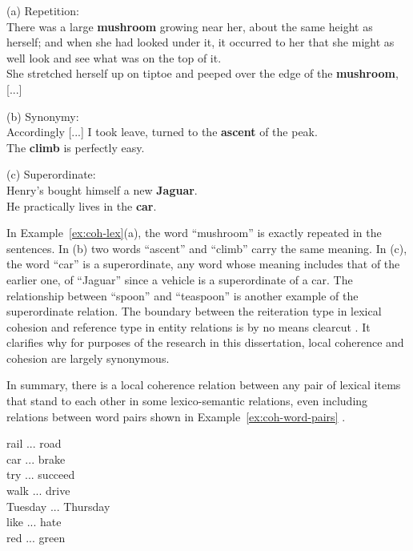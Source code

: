 \begin{examples}
    \label{ex:coh-lex}
    (a) Repetition: \\
    There was a large \textbf{mushroom} growing near her, about the same height as herself; and when she had looked under it, it occurred to her that she might as well look and see what was on the top of it.\\
    She stretched herself up on tiptoe and peeped over the edge of the \textbf{mushroom}, [...] 

    (b) Synonymy: \\
    Accordingly [...] I took leave, turned to the \textbf{ascent} of the peak. \\
    The \textbf{climb} is perfectly easy. 

    (c) Superordinate: \\
    Henry's bought himself a new \textbf{Jaguar}. \\
    He practically lives in the \textbf{car}. 

\end{examples} 

In Example~\ref{ex:coh-lex}(a), the word ``mushroom'' is exactly repeated in the sentences.  
In (b) two words ``ascent'' and ``climb'' carry the same meaning. 
In (c), the word ``car'' is a superordinate, any word whose meaning includes that of the earlier one, of ``Jaguar'' since a vehicle is a superordinate of a car. 
The relationship between ``spoon'' and ``teaspoon'' is another example of the superordinate relation. 
The boundary between the reiteration type in lexical cohesion and reference type in entity relations is by no means clearcut \cite{halliday76}. 
It clarifies why for purposes of the research in this dissertation, local coherence and cohesion are largely synonymous. 

In summary, there is a local coherence relation between any pair of lexical items that stand to each other in some lexico-semantic relations, even including relations between word pairs shown in Example~\ref{ex:coh-word-pairs} \cite{halliday76}. %

\begin{examples}
    \label{ex:coh-word-pairs}
    rail ... road \\
    car ... brake \\
    try ... succeed \\
    walk ... drive \\
    Tuesday ... Thursday \\
    like ... hate \\
    red ... green 
\end{examples}

